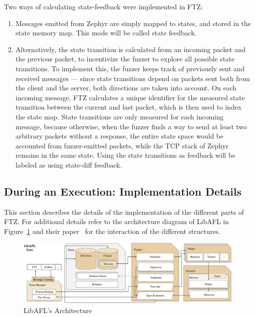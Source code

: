 \documentclass{article}
\newcommand{\proj}{FTZ\xspace}
\let\savedCite=\cite
\renewcommand{\cite}{\unskip~\savedCite}
\begin{document}
\begin{multicols}{2}
  Two ways of calculating state-feedback were implemented in \proj :
  \begin{enumerate}
    \item Messages emitted from Zephyr are simply mapped to states, and stored in the state memory map. This mode will be called state feedback.
    \item Alternatively, the state transition is calculated from an incoming packet and the previous packet, to incentivize the fuzzer to explore all possible state transitions. To implement this, the fuzzer keeps track of previously sent and received messages — since state transitions depend on packets sent both from the client and the server, both directions are taken into account. On each incoming message, \proj calculates a unique identifier for the measured state transition between the current and last packet, which is then used to index the state map. State transitions are only measured for each incoming message, because otherwise, when the fuzzer finds a way to send at least two arbitrary packets without a response, the entire state space would be accounted from fuzzer-emitted packets, while the TCP stack of Zephyr remains in the same state. Using the state transitions as feedback will be labeled as using state-diff feedback.
  \end{enumerate}

  \subsection{During an Execution: Implementation Details}

  This section describes the details of the implementation of the different parts of \proj. For additional details refer to the architecture diagram of LibAFL in Figure~\ref{fig:LibAFLArchitecture} and their paper\cite{LibAFL} for the interaction of the different structures.

\end{multicols}
\vspace{1em}
\begin{figure}[htb]
  \centering
  \includegraphics[width=\textwidth]{assets/LibAFLArchitecture.png}
  \caption{LibAFL's Architecture\cite{LibAFL}}
  \label{fig:LibAFLArchitecture}
\end{figure}
\end{document}
